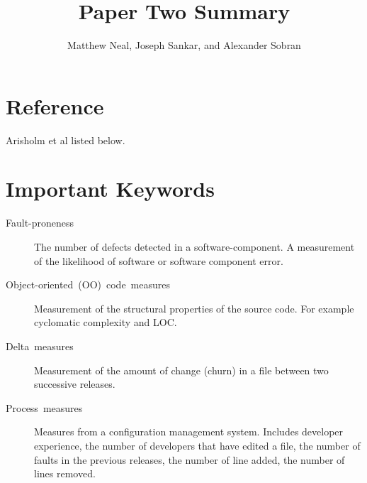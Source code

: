 \documentclass[english]{article}
\begin{document}
\title{Paper Two Summary}


\author{Matthew Neal, Joseph Sankar, and Alexander Sobran}

\maketitle

\section*{Reference}

Arisholm et al \cite{arisholm10} listed below.


\section*{Important Keywords}
\begin{description}
\item [{Fault-proneness}] The number of defects detected in a software-component.
A measurement of the likelihood of software or software component
error. 
\item [{Object-oriented~(OO)~code~measures}] Measurement of the structural
properties of the source code. For example cyclomatic complexity and LOC.
\item [{Delta~measures}] Measurement of the amount of change (churn) in
a file between two successive releases. 
\item [{Process~measures}] Measures from a configuration management system.
Includes developer experience, the number of developers that have
edited a file, the number of faults in the previous releases, the
number of line added, the number of lines removed. 
\end{description}
\end{document}
